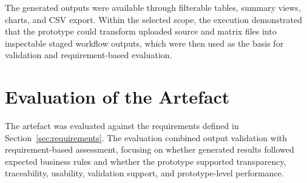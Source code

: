 The generated outputs were available through filterable tables, summary views, charts, and CSV export. Within the selected scope, the execution demonstrated that the prototype could transform uploaded source and matrix files into inspectable staged workflow outputs, which were then used as the basis for validation and requirement-based evaluation.






\section{Evaluation of the Artefact}

The artefact was evaluated against the requirements defined in Section~\ref{sec:requirements}. The evaluation combined output validation with requirement-based assessment, focusing on whether generated results followed expected business rules and whether the prototype supported transparency, traceability, usability, validation support, and prototype-level performance.





